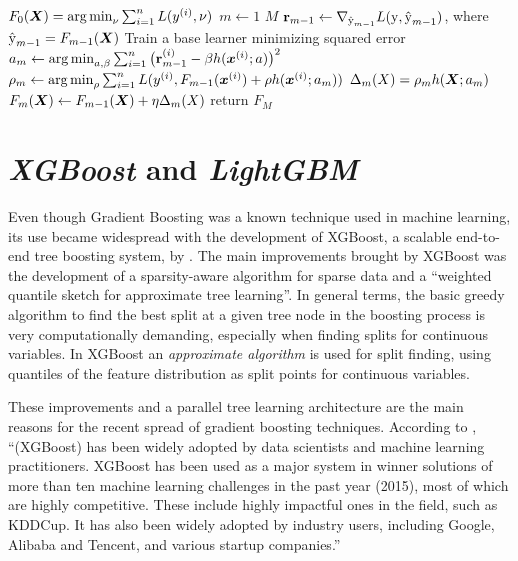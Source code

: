 \begin{codebox}
    \li $F_0(\bm{X}) = \operatorname*{arg\,min}_{\nu}\sum_{i=1}^n L(y^{(i)}, \nu)$
    \li \For $m \gets 1$ \To $M$
    \li     \Do
                $\textbf{{\text{\textup{r}}}}_{m-1} \gets \nabla_{\hat{{\text{\textup{y}}}}_{m-1}}L(\text{\textup{y}},\hat{{\text{\textup{y}}}}_{m-1})$, where $\hat{{\text{\textup{y}}}}_{m-1}=F_{m-1}(\bm{X})$
    \li         \Comment Train a base learner minimizing squared error
    \li         $a_m \gets \operatorname*{arg\,min}_{a, \beta}\sum_{i=1}^n\big(\textbf{{\text{\textup{r}}}}_{m-1}^{(i)}-\beta h(\bm{x}^{(i)};a)\big)^2$
    \li         $\rho_m \gets \operatorname*{arg\,min}_{\rho}\sum_{i=1}^n L(y^{(i)}, F_{m-1}(\bm{x}^{(i)}) + \rho h(\bm{x}^{(i)};a_m))$
    \li         $\Delta_m(X) =\rho_m h(\bm{X}; a_m)$
    \li         $F_m(\bm{X}) \gets F_{m-1}(\bm{X}) + \eta \Delta_m(X)$
            \End
    \li return $F_M$
    \end{codebox}
    
\section{\textit{XGBoost} and \textit{LightGBM}}
\label{lightgbm-explanation}

Even though Gradient Boosting was a known technique used in machine learning, its use became widespread with the development of XGBoost, a scalable end-to-end tree boosting system, by \cite{chen2016xgboost}. The main improvements brought by XGBoost was the development of a sparsity-aware algorithm for sparse data and a ``weighted quantile sketch for approximate tree learning''. In general terms, the basic greedy algorithm to find the best split at a given tree node in the boosting process is very computationally demanding, especially when finding splits for continuous variables. In XGBoost an \textit{approximate algorithm} is used for split finding, using quantiles of the feature distribution as split points for continuous variables. 

These improvements and a parallel tree learning architecture are the main reasons for the recent spread of gradient boosting techniques. According to \cite{chen2015xgboost}, ``(XGBoost) has been widely adopted by data scientists and machine learning practitioners. XGBoost has been used as a major system in winner solutions of more than ten machine learning challenges in the past year (2015), most of which are highly competitive. These include highly impactful ones in the field, such as KDDCup. It has also been widely adopted by industry users, including Google, Alibaba and Tencent, and various startup companies.''


